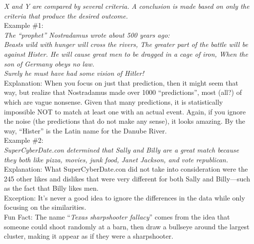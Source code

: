 \documentclass[a4paper,12pt,single,pdftex]{scrartcl}
\begin{document}
    
      {\em X and Y are compared by several criteria.} \newline
{\em A conclusion is made based on only the criteria that produce the desired outcome.}
    \\

    
      Example \#1:
    \\

    
      {\em The “prophet” Nostradamus wrote about 500 years ago:}
    \\

    
      {\em Beasts wild with hunger will cross the rivers, \newline
The greater part of the battle will be against Hister. \newline
He will cause great men to be dragged in a cage of iron, \newline
When the son of Germany obeys no law.}
    \\

    
      {\em Surely he must have had some vision of Hitler!}
    \\

    
      Explanation: When you focus on just that prediction, then it might seem that way, but realize that Nostradamus made over 1000 “predictions”, most (all?) of which are vague nonsense.  Given that many predictions, it is statistically impossible NOT to match at least one with an actual event.  Again, if you ignore the noise (the predictions that do not make any sense), it looks amazing.  By the way, “Hister” is the Latin name for the Danube River.
    \\

    
      Example \#2:
    \\

    
      {\em SuperCyberDate.con determined that Sally and Billy are a great match because they both like pizza, movies, junk food, Janet Jackson, and vote republican.}
    \\

    
      Explanation: What SuperCyberDate.con did not take into consideration were the 245 other likes and dislikes that were very different for both Sally and Billy—such as the fact that Billy likes men.
    \\

    
      Exception: It's never a good idea to ignore the differences in the data while only focusing on the similarities.
    \\

    
      Fun Fact: The name “{\em Texas sharpshooter fallacy}” comes from the idea that someone could shoot randomly at a barn, then draw a bullseye around the largest cluster, making it appear as if they were a sharpshooter.
    \\
\end{document}
